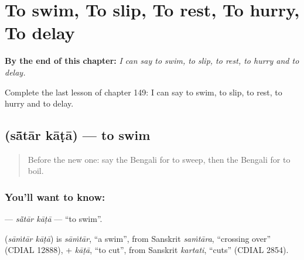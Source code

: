 
\chapter{To swim, To slip, To rest, To hurry, To delay}
\label{ch:bn-to-swim-to-slip-to-rest-to-hurry-to-delay}

\begin{chapteropening}
\textbf{By the end of this chapter:} \emph{I can say to swim, to slip, to rest, to hurry and to delay.}

Complete the last lesson of chapter 149: I can say to swim, to slip, to rest, to hurry and to delay.
\end{chapteropening}

\section[\texorpdfstring{\bn{সাঁতার} \bn{কাটা} (sā̃tār kāṭā)}{সাঁতার কাটা (sā̃tār kāṭā)}]{  (sā̃tār kāṭā) — to swim}

\label{lesson:BN-C149-satar-kata}



\begin{quote}
Before the new one: say the Bengali for to sweep, then the Bengali for to boil.
\end{quote}

\subsection*{You'll want to know:  }
\textbf{ } — \emph{sā̃tār kāṭā} — \textquotedblleft{}to swim\textquotedblright{}.

\begin{cousinweb}
\textbf{ } (\emph{sāṁtār kāṭā}) is \emph{sāṁtār}, \textquotedblleft{}a swim\textquotedblright{}, from Sanskrit \emph{saṁtāra}, \textquotedblleft{}crossing over\textquotedblright{} (CDIAL 12888), + \emph{kāṭā}, \textquotedblleft{}to cut\textquotedblright{}, from Sanskrit \emph{kartati}, \textquotedblleft{}cuts\textquotedblright{} (CDIAL 2854).
\end{cousinweb}

